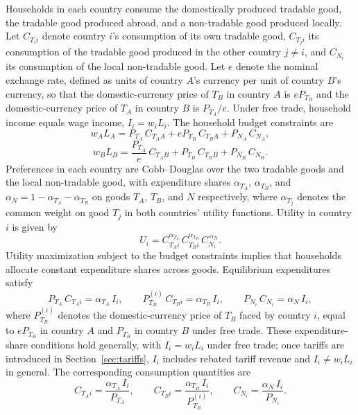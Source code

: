 \documentclass[11pt]{article}
\theoremstyle{plain}
\theoremstyle{remark}
\numberwithin{lemma}{section}
\numberwithin{proposition}{section}
\numberwithin{corollary}{section}
\begin{document}
Households in each country consume the domestically produced tradable good, the tradable good produced abroad, and a non-tradable good produced locally. Let $C_{T_i i}$ denote country $i$'s consumption of its own tradable good, $C_{T_j i}$ its consumption of the tradable good produced in the other country $j \neq i$, and $C_{N_i}$ its consumption of the local non-tradable good. Let $e$ denote the nominal exchange rate, defined as units of country $A$'s currency per unit of country $B$'s currency, so that the domestic-currency price of $T_B$ in country $A$ is $eP_{T_B}$ and the domestic-currency price of $T_A$ in country $B$ is $P_{T_A}/e$. Under free trade, household income equals wage income, $I_i = w_i L_i$. The household budget constraints are
\begin{equation}
w_A L_A = P_{T_A}\, C_{T_A A} + e P_{T_B}\, C_{T_B A} + P_{N_A}\, C_{N_A},
\label{eq:budget_A}
\end{equation}
\begin{equation}
w_B L_B = \frac{P_{T_A}}{e}\, C_{T_A B} + P_{T_B}\, C_{T_B B} + P_{N_B}\, C_{N_B}.
\label{eq:budget_B}
\end{equation}
Preferences in each country are Cobb--Douglas over the two tradable goods and the local non-tradable good, with expenditure shares $\alpha_{T_A}$, $\alpha_{T_B}$, and $\alpha_N = 1 - \alpha_{T_A} - \alpha_{T_B}$ on goods $T_A$, $T_B$, and $N$ respectively, where $\alpha_{T_j}$ denotes the common weight on good $T_j$ in both countries' utility functions. Utility in country $i$ is given by
\[
U_i = C_{T_A i}^{\alpha_{T_A}}\, C_{T_B i}^{\alpha_{T_B}}\, C_{N_i}^{\,\alpha_N}.
\]
Utility maximization subject to the budget constraints implies that households allocate constant expenditure shares across goods. Equilibrium expenditures satisfy
\begin{equation}
P_{T_A}\, C_{T_A i} = \alpha_{T_A}\, I_i, \qquad P_{T_B}^{(i)}\, C_{T_B i} = \alpha_{T_B}\, I_i, \qquad P_{N_i}\, C_{N_i} = \alpha_N\, I_i,
\label{eq:expenditures}
\end{equation}
where $P_{T_B}^{(i)}$ denotes the domestic-currency price of $T_B$ faced by country $i$, equal to $eP_{T_B}$ in country $A$ and $P_{T_B}$ in country $B$ under free trade. These expenditure-share conditions hold generally, with $I_i = w_i L_i$ under free trade; once tariffs are introduced in Section~\ref{sec:tariffs}, $I_i$ includes rebated tariff revenue and $I_i \neq w_i L_i$ in general. The corresponding consumption quantities are
\begin{equation}
C_{T_A i} = \frac{\alpha_{T_A}\, I_i}{P_{T_A}}, \qquad C_{T_B i} = \frac{\alpha_{T_B}\, I_i}{P_{T_B}^{(i)}}, \qquad C_{N_i} = \frac{\alpha_N\, I_i}{P_{N_i}}.
\label{eq:demands}
\end{equation}
\end{document}
